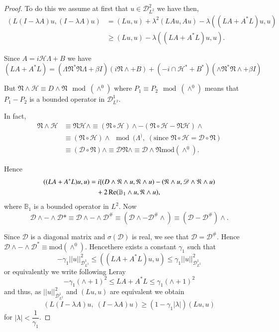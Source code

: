 \begin{proof}
To do this we assume at first that $u \in \mathscr{D}^2_{L^2}$
we have then, 
\begin{align*}
(L(I - \lambda A)u, (I - \lambda A)u) & = (Lu, u) + \lambda^2 (LAu,
  Au) - \lambda((LA + A^* L) u, u)\\ 
& \geq (Lu, u) - \lambda ((LA + A^* L) u, u).
\end{align*}

Since $A = i \mathscr{H} \Lambda + B$ we have  
$$
(LA + A^*L) = (\Lambda \mathfrak{N}^* \mathfrak{N} \Lambda + \beta
I)(i\mathfrak{N}\wedge +B)+ (-i
\cap  \mathscr{H}^* + B^*) (\wedge \mathfrak{N}^* \mathfrak{N} \wedge
+ \beta I) 
$$

But $\mathfrak{N} \wedge \mathscr{H} \equiv D \wedge \mathfrak{N} \mod
(\wedge^0)$ where $P_1 \equiv P_2 \mod (\wedge^0)$ means that $P_1 -
P_2$ is a bounded operator in $\mathscr{D}^1_{L^2}$. 

In fact,
\begin{align*}
\mathfrak{N} \wedge \mathscr{H} &\equiv \mathfrak{N} \mathscr{H}
\wedge \equiv (\mathfrak{N} \circ \mathscr{H}) \wedge - (\mathfrak{N} \circ
\mathscr{H} - \mathfrak{N} \mathscr{H}) \wedge\\ 
& \equiv (\mathfrak{N} \circ \mathscr{H}) \wedge \mod (\Lambda^), \;  (\text
  {since } \mathfrak{N} \circ \mathscr{H} = \mathscr{D} \circ \mathfrak{N})
  \\ 
& \equiv (\mathscr{D} \circ \mathfrak{N}) \wedge \equiv \mathscr{D}
  \mathfrak{N} \wedge \equiv \mathscr{D} \wedge \mathfrak{N} \text{mod}
  (\wedge^0). 
\end{align*}

Hence 
\begin{align*}
((LA+A^* L) u, u) & = i \{ (D \wedge \mathfrak{N} \wedge u,
\mathfrak{N} \wedge u) - (\mathfrak{N} \wedge u, \mathscr{D} \wedge
\mathfrak{N} \wedge u)\\
&\quad + 2 \operatorname{Re} (\mathbb{B}_1 \wedge u, \mathfrak{N} \wedge u),
\end{align*}
where $\mathbb{B}_1$ is a bounded operator in $L^2$. Now 
$$ 
\mathscr{D} \wedge - \wedge \mathscr{D}*\equiv \mathscr{D} \wedge -
\wedge \mathscr{D}^{\#} \equiv (\mathscr{D} \wedge -
\mathscr{D}^{\#}\wedge)\equiv (\mathscr{D}-\mathscr{D}^{\#}) \wedge. 
$$ 

Since $\mathscr{D}$ is a diagonal matrix and $\sigma (\mathscr{D})$ is
real, we see that $\mathscr{D} = \mathscr{D}^{\#}$. Hence $\mathscr{D}
\wedge - \wedge \mathscr{D}^* \equiv \text{mod}
(\wedge^0)$. Hence\pageoriginale there exists a constant $\gamma_1$
such that   
$$
-\gamma_1 || u ||^2_{\mathscr{D}^1_{L^{2}}} \leq ((L A + A^* L ) u, u)
\leq \gamma_1 || u ||^2_{\mathscr{D}^1_{L^{2}}} 
$$
or equivalently we write following Leray \cite{key1}
$$
-\gamma_1(\wedge + 1)^2 \leq LA + A^* L \leq \gamma_1 (\wedge + 1)^2 
$$
and thus, as $||u ||^2_{\mathscr{D}^1_{L^{2}}}$ and $(Lu, u)$ are
equivalent we obtain 
$$
(L (I - \lambda A) u, \; (I - \lambda A) u) \geq (1- \gamma_1 | \lambda
|) (Lu, u) 
$$
for $|\lambda | < \dfrac{1}{\gamma_1}$.


\end{proof}
